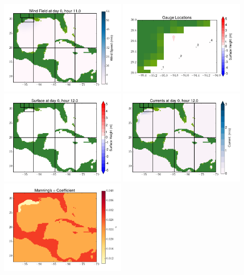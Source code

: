 \documentclass[11pt]{article}
\begin{document}
\vskip 10pt 
\includegraphics[width=0.475\textwidth]{frame0083fig9.png}
\includegraphics[width=0.475\textwidth]{frame0083fig10.png}
\vskip 10pt 
\includegraphics[width=0.475\textwidth]{frame0084fig1.png}
\includegraphics[width=0.475\textwidth]{frame0084fig2.png}
\vskip 10pt 
\includegraphics[width=0.475\textwidth]{frame0084fig3.png}
\end{document}
